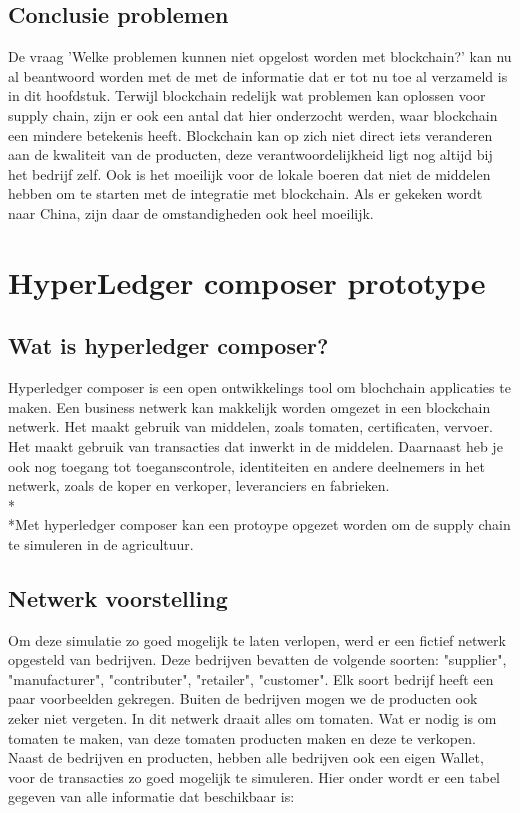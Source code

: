 \documentclass[fleqn,a4paper,12pt]{book}
\begin{document}
\section{Conclusie problemen}
De vraag 'Welke problemen kunnen niet opgelost worden met blockchain?' kan nu al beantwoord worden met de met de informatie dat er tot nu toe al verzameld is in dit hoofdstuk. Terwijl blockchain redelijk wat problemen kan oplossen voor supply chain, zijn er ook een antal dat hier onderzocht werden, waar blockchain een mindere betekenis heeft. Blockchain kan op zich niet direct iets veranderen aan de kwaliteit van de producten, deze verantwoordelijkheid ligt nog altijd bij het bedrijf zelf. Ook is het moeilijk voor de lokale boeren dat niet de middelen hebben om te starten met de integratie met blockchain. Als er gekeken wordt naar China, zijn daar de omstandigheden ook heel moeilijk.

\chapter{HyperLedger composer prototype}
\section{Wat is hyperledger composer?}
Hyperledger composer is een open ontwikkelings tool om blochchain applicaties te maken. Een business netwerk kan makkelijk worden omgezet in een blockchain netwerk. Het maakt gebruik van middelen, zoals tomaten, certificaten, vervoer. Het maakt gebruik van transacties dat inwerkt in de middelen. Daarnaast heb je ook nog toegang tot toeganscontrole, identiteiten en andere deelnemers in het netwerk, zoals de koper en verkoper, leveranciers en fabrieken.\\*\\*Met hyperledger composer kan een protoype opgezet worden om de supply chain te simuleren in de agricultuur.
~\autocite{composer1}

\section{Netwerk voorstelling}
Om deze simulatie zo goed mogelijk te laten verlopen, werd er een fictief netwerk opgesteld van bedrijven. Deze bedrijven bevatten de volgende soorten: "supplier", "manufacturer", "contributer", "retailer", "customer". Elk soort bedrijf heeft een paar voorbeelden gekregen. Buiten de bedrijven mogen we de producten ook zeker niet vergeten. In dit netwerk draait alles om tomaten. Wat er nodig is om tomaten te maken, van deze tomaten producten maken en deze te verkopen. Naast de bedrijven en producten, hebben alle bedrijven ook een eigen Wallet, voor de transacties zo goed mogelijk te simuleren. Hier onder wordt er een tabel gegeven van alle informatie dat beschikbaar is:
\end{document}
